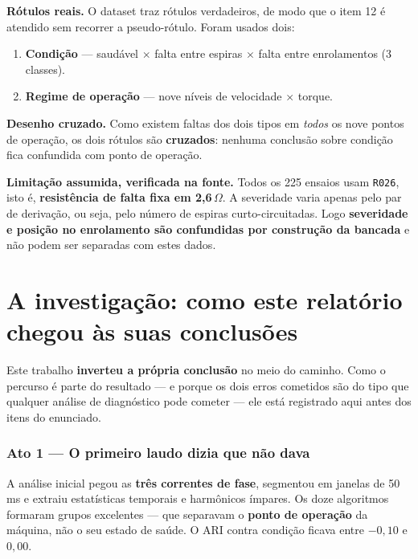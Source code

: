 \documentclass[12pt,a4paper]{article}
\begin{document}
\textbf{Rótulos reais.} O dataset traz rótulos verdadeiros, de modo que o item 12 é atendido sem recorrer a pseudo-rótulo. Foram usados dois:
\begin{enumerate}[nosep]
    \item \textbf{Condição} --- saudável $\times$ falta entre espiras $\times$ falta entre enrolamentos (3 classes).
    \item \textbf{Regime de operação} --- nove níveis de velocidade $\times$ torque.
\end{enumerate}

\textbf{Desenho cruzado.} Como existem faltas dos dois tipos em \emph{todos} os nove pontos de operação, os dois rótulos são \textbf{cruzados}: nenhuma conclusão sobre condição fica confundida com ponto de operação.

\textbf{Limitação assumida, verificada na fonte.} Todos os 225 ensaios usam \texttt{R026}, isto é, \textbf{resistência de falta fixa em 2,6\,$\Omega$}. A severidade varia apenas pelo par de derivação, ou seja, pelo número de espiras curto-circuitadas. Logo \textbf{severidade e posição no enrolamento são confundidas por construção da bancada} e não podem ser separadas com estes dados.

\newpage
\section*{A investigação: como este relatório chegou às suas conclusões}

Este trabalho \textbf{inverteu a própria conclusão} no meio do caminho. Como o percurso é parte do resultado --- e porque os dois erros cometidos são do tipo que qualquer análise de diagnóstico pode cometer --- ele está registrado aqui antes dos itens do enunciado.

\subsubsection*{Ato 1 --- O primeiro laudo dizia que não dava}

A análise inicial pegou as \textbf{três correntes de fase}, segmentou em janelas de 50\,ms e extraiu estatísticas temporais e harmônicos ímpares. Os doze algoritmos formaram grupos excelentes --- que separavam o \textbf{ponto de operação} da máquina, não o seu estado de saúde. O ARI contra condição ficava entre $-0{,}10$ e $0{,}00$.
\end{document}
